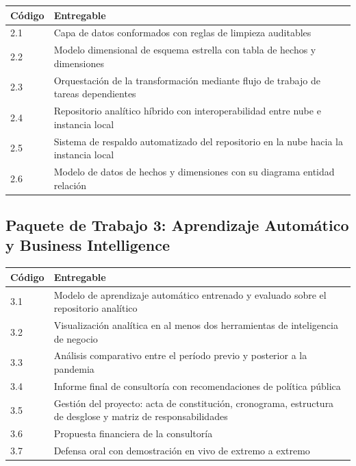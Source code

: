 \documentclass[12pt,a4paper]{article}
\begin{document}
\vspace{4pt}
{\small
\begin{tabularx}{\linewidth}{@{} l X @{}}
  \toprule
  \textbf{Código} & \textbf{Entregable} \\
  \midrule
  2.1 & Capa de datos conformados con reglas de limpieza auditables \\[3pt]
  2.2 & Modelo dimensional de esquema estrella con tabla de hechos y dimensiones \\[3pt]
  2.3 & Orquestación de la transformación mediante flujo de trabajo de tareas dependientes \\[3pt]
  2.4 & Repositorio analítico híbrido con interoperabilidad entre nube e instancia local \\[3pt]
  2.5 & Sistema de respaldo automatizado del repositorio en la nube hacia la instancia local \\[3pt]
  2.6 & Modelo de datos de hechos y dimensiones con su diagrama entidad relación \\
  \bottomrule
\end{tabularx}
}

\subsection{Paquete de Trabajo 3: Aprendizaje Automático y Business Intelligence}

\vspace{4pt}
{\small
\begin{tabularx}{\linewidth}{@{} l X @{}}
  \toprule
  \textbf{Código} & \textbf{Entregable} \\
  \midrule
  3.1 & Modelo de aprendizaje automático entrenado y evaluado sobre el repositorio analítico \\[3pt]
  3.2 & Visualización analítica en al menos dos herramientas de inteligencia de negocio \\[3pt]
  3.3 & Análisis comparativo entre el período previo y posterior a la pandemia \\[3pt]
  3.4 & Informe final de consultoría con recomendaciones de política pública \\[3pt]
  3.5 & Gestión del proyecto: acta de constitución, cronograma, estructura de desglose
        y matriz de responsabilidades \\[3pt]
  3.6 & Propuesta financiera de la consultoría \\[3pt]
  3.7 & Defensa oral con demostración en vivo de extremo a extremo \\
  \bottomrule
\end{tabularx}
}
\end{document}
